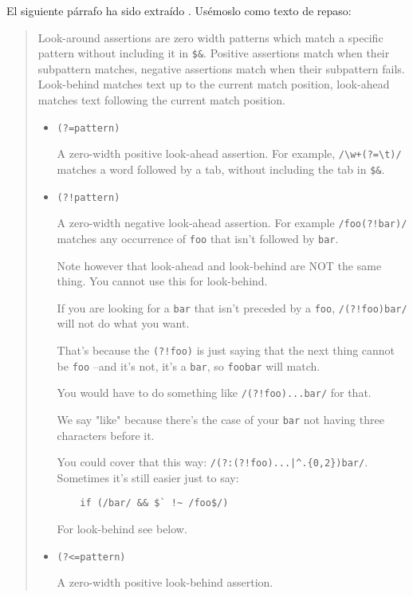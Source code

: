 El siguiente párrafo ha sido extraído .
Usémoslo como texto de repaso:
\begin{it}
\begin{quotation}
Look-around assertions are zero width patterns which match a specific
pattern without including it in \verb|$&|. Positive assertions match when their
subpattern matches, negative assertions match when their subpattern
fails. Look-behind matches text up to the current match position,
look-ahead matches text following the current match position.

\begin{itemize}
\item \verb|(?=pattern)|

A zero-width positive look-ahead assertion. For example, \verb|/\w+(?=\t)/| 
matches a word followed by a tab, without including the tab in \verb|$&|.

\item \verb|(?!pattern)|

A zero-width negative look-ahead assertion. For example \verb|/foo(?!bar)/| 
matches any occurrence of \verb"foo" that isn't followed by \verb"bar". 

Note however that look-ahead and look-behind are NOT the same thing. 
You cannot use this for look-behind.

If you are looking for a \verb"bar" that isn't preceded by a \verb"foo",
\verb|/(?!foo)bar/| will not do what you want. 

That's because the 
\verb#(?!foo)# is just saying that the next thing cannot be \verb"foo"
--and it's not, it's a \verb"bar", so \verb"foobar" will match. 

You would have to do something like \verb#/(?!foo)...bar/# for that. 

We say "like" because there's the case of your \verb"bar" not having
three characters before it. 

You could cover that this way:
\verb#/(?:(?!foo)...|^.{0,2})bar/#. Sometimes it's still easier just to say:

\begin{verbatim}
    if (/bar/ && $` !~ /foo$/)
\end{verbatim}

For look-behind see below.

\item \verb|(?<=pattern)|

A zero-width positive look-behind assertion. 


\end{itemize}
\end{quotation}
\end{it}

